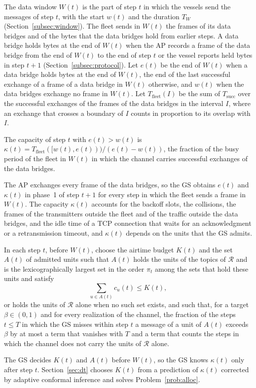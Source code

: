 The data window $W(t)$ is the part of step $t$ in which the vessels send the messages of step $t$, with the start $w(t)$ and the duration $T_W$ (Section~\ref{subsec:window}). The fleet sends in $W(t)$ the frames of its data bridges and of the bytes that the data bridges hold from earlier steps. A data bridge holds bytes at the end of $W(t)$ when the AP records a frame of the data bridge from the end of $W(t)$ to the end of step $t$ or the vessel reports held bytes in step $t+1$ (Section~\ref{subsec:protocol}). Let $e(t)$ be the end of $W(t)$ when a data bridge holds bytes at the end of $W(t)$, the end of the last successful exchange of a frame of a data bridge in $W(t)$ otherwise, and $w(t)$ when the data bridges exchange no frame in $W(t)$. Let $T_{\mathrm{fleet}}(I)$ be the sum of $T_{\mathrm{succ}}$ over the successful exchanges of the frames of the data bridges in the interval $I$, where an exchange that crosses a boundary of $I$ counts in proportion to its overlap with $I$.

\begin{definition}[Capacity]\label{def:capacity}
The capacity of step $t$ with $e(t) > w(t)$ is $\kappa(t) = T_{\mathrm{fleet}}([w(t), e(t)))/(e(t) - w(t))$, the fraction of the busy period of the fleet in $W(t)$ in which the channel carries successful exchanges of the data bridges.
\end{definition}

The AP exchanges every frame of the data bridges, so the GS obtains $e(t)$ and $\kappa(t)$ in phase~1 of step $t+1$ for every step in which the fleet sends a frame in $W(t)$. The capacity $\kappa(t)$ accounts for the backoff slots, the collisions, the frames of the transmitters outside the fleet and of the traffic outside the data bridges, and the idle time of a TCP connection that waits for an acknowledgment or a retransmission timeout, and $\kappa(t)$ depends on the units that the GS admits.

\begin{problem}\label{prob:alloc}
In each step $t$, before $W(t)$, choose the airtime budget $K(t)$ and the set $A(t)$ of admitted units such that $A(t)$ holds the units of the topics of $\mathcal{R}$ and is the lexicographically largest set in the order $\pi_t$ among the sets that hold these units and satisfy
\begin{equation}
\sum_{u \in A(t)} c_u(t) \leq K(t),
\label{eq:feas}
\end{equation}
or holds the units of $\mathcal{R}$ alone when no such set exists, and such that, for a target $\beta \in (0, 1)$ and for every realization of the channel, the fraction of the steps $t \leq T$ in which the GS misses within step $t$ a message of a unit of $A(t)$ exceeds $\beta$ by at most a term that vanishes with $T$ and a term that counts the steps in which the channel does not carry the units of $\mathcal{R}$ alone.
\end{problem}

The GS decides $K(t)$ and $A(t)$ before $W(t)$, so the GS knows $\kappa(t)$ only after step $t$. Section~\ref{sec:dt} chooses $K(t)$ from a prediction of $\kappa(t)$ corrected by adaptive conformal inference and solves Problem~\ref{prob:alloc}.
